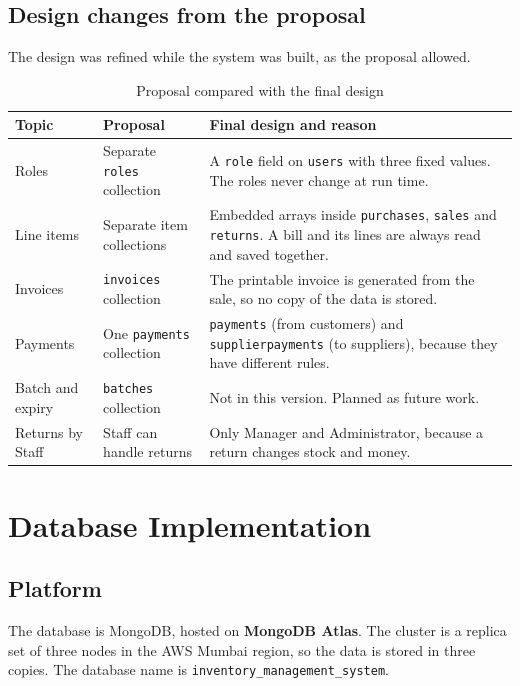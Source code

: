 \documentclass[11pt,a4paper]{article}
\newcommand{\code}[1]{\texttt{#1}}
\begin{document}
\subsection{Design changes from the proposal}
The design was refined while the system was built, as the proposal allowed.
\begin{table}[H]
\centering
\begin{tabularx}{\textwidth}{@{}P{2.7cm}P{4.2cm}Y@{}}
\toprule
\textbf{Topic} & \textbf{Proposal} & \textbf{Final design and reason} \\
\midrule
Roles & Separate \code{roles} collection & A \code{role} field on \code{users} with three fixed values. The roles never change at run time. \\
Line items & Separate item collections & Embedded arrays inside \code{purchases}, \code{sales} and \code{returns}. A bill and its lines are always read and saved together. \\
Invoices & \code{invoices} collection & The printable invoice is generated from the sale, so no copy of the data is stored. \\
Payments & One \code{payments} collection & \code{payments} (from customers) and \code{supplierpayments} (to suppliers), because they have different rules. \\
Batch and expiry & \code{batches} collection & Not in this version. Planned as future work. \\
Returns by Staff & Staff can handle returns & Only Manager and Administrator, because a return changes stock and money. \\
\bottomrule
\end{tabularx}
\caption{Proposal compared with the final design}
\end{table}

\section{Database Implementation}
\subsection{Platform}
The database is MongoDB, hosted on \textbf{MongoDB Atlas}. The cluster is a replica set of three nodes in the AWS Mumbai region, so the data is stored in three copies. The database name is \code{inventory\_management\_system}.
\end{document}
